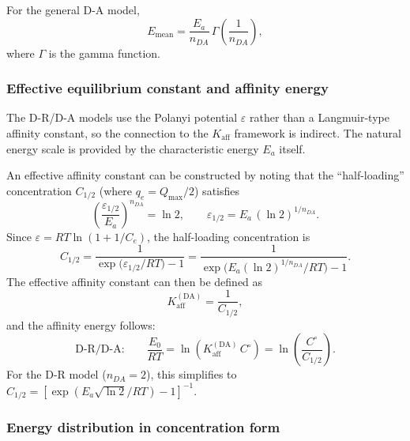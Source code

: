 	For the general D-A model,
	\begin{equation}
		E_{\mathrm{mean}} = \frac{E_a}{n_{DA}}\,
		\Gamma\!\left(\frac{1}{n_{DA}}\right),
		\label{eq:Emean_DA}
	\end{equation}
	where $\Gamma$ is the gamma function.

	\subsubsection{Effective equilibrium constant and affinity energy}

	The D-R/D-A models use the Polanyi potential $\varepsilon$ rather
	than a Langmuir-type affinity constant, so the connection to the
	$K_{\mathrm{aff}}$ framework is indirect.  The natural energy
	scale is provided by the characteristic energy $E_a$ itself.

	An effective affinity constant can be constructed by noting that
	the ``half-loading'' concentration $C_{1/2}$ (where
	$q_e = Q_{\max}/2$) satisfies
	\begin{equation}
		\left(\frac{\varepsilon_{1/2}}{E_a}\right)^{n_{DA}}
		= \ln 2,
		\qquad
		\varepsilon_{1/2}
		= E_a\,(\ln 2)^{1/n_{DA}}.
	\end{equation}
	Since $\varepsilon = RT\ln(1 + 1/C_e)$, the half-loading
	concentration is
	\begin{equation}
		C_{1/2}
		= \frac{1}{\exp\!\bigl(
		\varepsilon_{1/2}/RT\bigr) - 1}
		= \frac{1}{\exp\!\bigl(
		E_a(\ln 2)^{1/n_{DA}}/RT\bigr) - 1}.
		\label{eq:C12_DA}
	\end{equation}
	The effective affinity constant can then be defined as
	\begin{equation}
		K_{\mathrm{aff}}^{\mathrm{(DA)}}
		= \frac{1}{C_{1/2}},
		\label{eq:Kaff_DA}
	\end{equation}
	and the affinity energy follows:
	\begin{equation}
		\text{D-R/D-A:}\qquad
		\frac{E_0}{RT}
		= \ln(K_{\mathrm{aff}}^{\mathrm{(DA)}}\,C^\circ)
		= \ln\!\left(\frac{C^\circ}{C_{1/2}}\right).
		\label{eq:E_DA}
	\end{equation}
	For the D-R model ($n_{DA} = 2$), this simplifies to
	$C_{1/2} = [\exp(E_a\sqrt{\ln 2}/RT) - 1]^{-1}$.

	\subsubsection{Energy distribution in concentration form}


